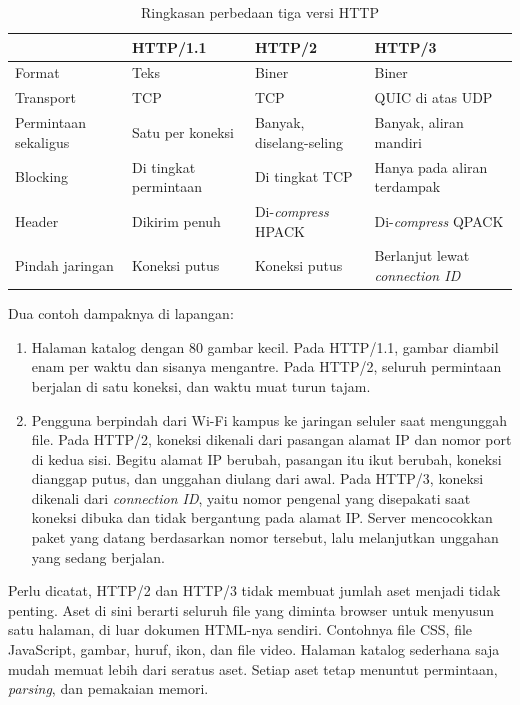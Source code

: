 \begin{table}[!htb]
  \centering
  \caption{Ringkasan perbedaan tiga versi HTTP}
  \label{tab:http-versi}
  \begin{tabularx}{\textwidth}{lXXX}
    \hline
     & \textbf{HTTP/1.1} & \textbf{HTTP/2} & \textbf{HTTP/3} \\
    \hline
    Format & Teks & Biner & Biner \\
    \hline
    Transport & TCP & TCP & QUIC di atas UDP \\
    \hline
    Permintaan sekaligus & Satu per koneksi & Banyak, diselang-seling & Banyak, aliran mandiri \\
    \hline
    Blocking & Di tingkat permintaan & Di tingkat TCP & Hanya pada aliran terdampak \\
    \hline
    Header & Dikirim penuh & Di-\textit{compress} HPACK & Di-\textit{compress} QPACK \\
    \hline
    Pindah jaringan & Koneksi putus & Koneksi putus & Berlanjut lewat \textit{connection ID} \\
    \hline
  \end{tabularx}
\end{table}

Dua contoh dampaknya di lapangan:

\begin{enumerate}
  \item Halaman katalog dengan 80 gambar kecil. Pada HTTP/1.1, gambar diambil
        enam per waktu dan sisanya mengantre. Pada HTTP/2, seluruh permintaan
        berjalan di satu koneksi, dan waktu muat turun tajam.
  \item Pengguna berpindah dari Wi-Fi kampus ke jaringan seluler saat mengunggah
        file. Pada HTTP/2, koneksi dikenali dari pasangan alamat IP dan nomor
        port di kedua sisi. Begitu alamat IP berubah, pasangan itu ikut berubah,
        koneksi dianggap putus, dan unggahan diulang dari awal. Pada HTTP/3,
        koneksi dikenali dari \textit{connection ID}, yaitu nomor pengenal yang
        disepakati saat koneksi dibuka dan tidak bergantung pada alamat IP.
        Server mencocokkan paket yang datang berdasarkan nomor tersebut, lalu
        melanjutkan unggahan yang sedang berjalan.
\end{enumerate}

Perlu dicatat, HTTP/2 dan HTTP/3 tidak membuat jumlah aset menjadi tidak
penting. Aset di sini berarti seluruh file yang diminta browser untuk
menyusun satu halaman, di luar dokumen HTML-nya sendiri. Contohnya file CSS,
file JavaScript, gambar, huruf, ikon, dan file video. Halaman katalog
sederhana saja mudah memuat lebih dari seratus aset. Setiap aset tetap menuntut
permintaan, \textit{parsing}, dan pemakaian memori.

